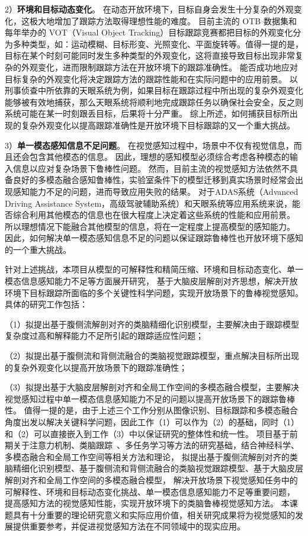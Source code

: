 \documentclass[a4paper,zihao=-4]{article}
\begin{document}
2）\textbf{环境和目标动态变化}。
在动态开放环境下，目标自身会发生十分复杂的外观变化，这极大地增加了跟踪方法取得理想性能的难度。
目前主流的 OTB 数据集\cite{wu2013online}和每年举办的 VOT（Visual Object Tracking）\cite{kristan2019seventh}目标跟踪竞赛都把目标的外观变化分为多种类型，如：运动模糊、目标形变、光照变化、平面旋转等。值得一提的是，目标在某个时刻可能同时发生多种类型的外观变化，这将直接导致目标出现非常复杂的外观变化，进而限制跟踪方法在开放环境下的跟踪准确性。
能否成功地应对目标复杂的外观变化将决定跟踪方法的跟踪性能和在实际问题中的应用前景。
以刑事侦查中所依靠的天眼系统为例，如果目标在跟踪过程中所出现的复杂外观变化能够被有效地捕获，那么天眼系统将顺利地完成跟踪任务以确保社会安全，反之则系统可能在某一时刻跟丢目标，后果将十分严重。
综上所述，如何捕获目标所出现的复杂外观变化以提高跟踪准确性是开放环境下目标跟踪的又一个重大挑战。

3）\textbf{单一模态感知信息不足问题}。
在视觉感知过程中，场景中不仅有视觉信息，而且还会包含其他模态的信息。
因此，理想的感知模型必须综合考虑各种模态的输入信息以应对复杂场景下鲁棒性问题。
然而，目前主流的视觉感知方法依然不具备良好的多模态融合感知鲁棒性，实验室条件下的模型迁移到真实场景时经常会出现感知能力不足的问题，进而导致应用失败的结果。
对于ADAS系统（Advanced Driving Assistance System，高级驾驶辅助系统）和天眼系统等应用系统来说，能否综合利用其他模态的信息也在很大程度上决定着这些系统的性能和应用前景。
所以理想情况下能融合其他模型的信息，将在一定程度上提高模型的感知能力。
因此，如何解决单一模态感知信息不足的问题以保证跟踪鲁棒性也开放环境下感知的一个重大挑战。


针对上述挑战，本项目从模型的可解释性和精简压缩、环境和目标动态变化、单一模态信息感知能力不足等方面展开研究，
基于大脑皮层解剖对齐思想，解决开放环境下目标跟踪所面临的多个关键性科学问题，实现开放场景下的鲁棒视觉感知。
具体的研究工作包括：

（1）拟提出基于腹侧流解剖对齐的类脑精细化识别模型，主要解决由于跟踪模型复杂度过高和解释能力不足所引起的跟踪适应性问题；

（2）拟提出基于腹侧流和背侧流融合的类脑视觉跟踪模型，重点解决目标所出现的复杂外观变化以提高开放场景下的跟踪准确性；

（3）拟提出基于大脑皮层解剖对齐和全局工作空间的多模态融合模型，主要解决视觉感知过程中单一模态信息感知能力不足的问题以提高开放场景下的跟踪鲁棒性。
值得一提的是，由于上述三个工作分别从图像识别、目标跟踪和多模态融合角度出发以解决关键科学问题，因此工作（1）可以作为（2）的基础，同时（1）和（2）可以直接嵌入到工作（3）中以保证研究的整体性和统一性。
项目基于前期关于注意力机制\cite{nai2018robust,li2018visual}、类脑跟踪~\cite{nai2019multi,li2020reliable}、多任务学习等方法的研究基础，结合神经科学、多模态融合和全局工作空间等相关方法和理论，
拟提出基于腹侧流解剖对齐的类脑精细化识别模型、基于腹侧流和背侧流融合的类脑视觉跟踪模型、基于大脑皮层解剖对齐和全局工作空间的多模态融合模型，
解决开放场景下视觉感知任务中的可解释性、环境和目标动态变化挑战、单一模态信息感知能力不足等重要问题，
提高感知方法的视觉感知性能，实现开放环境下的类脑鲁棒视觉感知方法。
本课题具有十分重要的理论研究意义和实际应用价值，相关研究成果将为视觉感知的发展提供重要参考，并促进视觉感知方法在不同领域中的现实应用。
\end{document}
